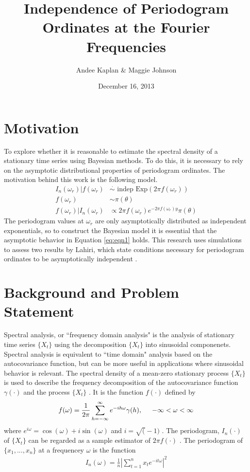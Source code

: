 \documentclass{article}\usepackage{graphicx, color}
\title{Independence of Periodogram Ordinates at the Fourier Frequencies}
\author{Andee Kaplan \& Maggie Johnson}
\date{December 16, 2013}
\theoremstyle{plain}
\begin{document}
\maketitle



\section{Motivation}

To explore whether it is reasonable to estimate the spectral density of a stationary time series using Bayesian methods. To do this, it is necessary to rely on the asymptotic distributional properties of periodogram ordinates. The motivation behind this work is the following model.
\begin{align}
\label{eq:eqn1}
I_n(\omega_r) |f(\omega_r) &\stackrel{\cdot}{\sim}\text{ indep } \text{Exp}(2\pi f(\omega_r)) \\
\label{eq:eqn2}
f(\omega_r) & \sim \pi(\theta)\\
\label{eq:eqn3}
f(\omega_r) | I_n(\omega_r) &\propto 2\pi f(\omega_r) e^{-2\pi f(\omega_r) y} \pi(\theta)
\end{align}
The periodogram values at $\omega_r$ are only asymptotically distributed as independent exponentials, so to construct the Bayesian model it is essential that the asymptotic behavior in Equation \ref{eq:eqn1} holds. This research uses simulations to assess two results by Lahiri, which state conditions necessary for periodogram ordinates to be asymptotically independent \cite{lahiri2003necessary}.


\section{Background and Problem Statement}

Spectral analysis, or ``frequency domain analysis" is the analysis of stationary time series $\{X_t\}$ using the decomposition $\{X_t\}$ into sinusoidal componenets. Spectral analysis is equivalent to ``time domain" analysis based on the autocovariance function, but can be more useful in applications where sinusoidal behavior is relevant. The spectral density of a mean-zero stationary process $\{X_t\}$ is used to describe the frequency decomposition of the autocovariance function $\gamma(\cdot)$ and the process $\{X_t\}$ \cite{brockwell2002introduction}. It is the function $f(\cdot)$ defined by 
\begin{align}
f(\omega) = \frac{1}{2\pi} \sum_{h=-\infty}^{\infty} e^{-ih\omega} \gamma(h), \hspace{.5cm} -\infty < \omega < \infty
\end{align}
where $e^{i\omega}=\cos(\omega)+i\sin(\omega)$ and $i=\sqrt(-1)$ \cite{brockwell2002introduction}. The periodogram, $I_n(\cdot)$ of $\{X_t\}$ can be regarded as a sample estimator of $2\pi f(\cdot)$ \cite{brockwell2002introduction}. The periodogram of $\{x_1,...,x_n\}$ at a frequencey $\omega$ is the function
\begin{align}
I_n(\omega) = \frac{1}{n} \left\lvert \sum_{t=1}^n x_t e^{-it\omega} \right\rvert^2
\end{align}
\end{document}

